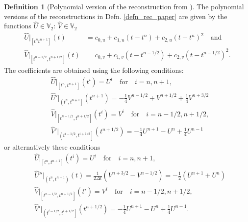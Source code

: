\documentclass[12pt,a4paper]{article}
\numberwithin{equation}{section}
\theoremstyle{definition}
\newcommand{\qp}[1]{\left(#1\right)}
\newcommand{\qpb}[1]{\left(#1\right]}
\newcommand{\qb}[1]{\left[#1\right]}
\newcommand{\rec}[1]{\widehat{{#1}}}
\newtheorem{Defn}[subsection]{Definition}
\begin{document}
\begin{Defn}[Polynomial version of the reconstruction from \cite{georgoulis2016posteriori}]\label{defn_rec_paper_poly}
	The polynomial versions of the reconstructions in Defn. \ref{defn_rec_paper} are given by the functions $\rec{U}\in \mathbb{V}_2$: $\rec{V}\in\mathbb{V}_2$ 
	\begin{equation}\label{eq_rec_paper_poly_alternative}
	\begin{aligned}
	\hat{U}|_{\qb{t^{n} t^{n+1}}}\qp{t}&=c_{0,u}+c_{1,u}\qp{t-t^{n}}+c_{2,u}\qp{t-t^{n}}^2\quad \text{and}\\
	\hat{V}|_{\qb{t^{n-1/2}, t^{n+1/2}}}\qp{t}&=c_{0,v}+c_{1,v}\qp{t-t^{n-1/2}}+c_{2,v}\qp{t-t^{n-1/2}}^2.
	\end{aligned}
	\end{equation}
	The coefficients are obtained using the following conditions:
	\begin{equation}
\begin{aligned}
&\rec{U}|_{\qb{t^n,t^{n+1}}}\qp{t^i}=U^i \quad \text{for}\quad i= n, n+1,\\
&\rec{U}'|_{\qpb{t^n,t^{n+1}}}\qp{t^{n+1}}=-\frac{1}{4}V^{n-1/2}+V^{n+1/2}+\frac{1}{4}V^{n+3/2}\\%
&\rec{V}|_{\qb{t^{n-1/2},t^{n+1/2}}}\qp{t^i}=V^i \quad \text{for}\quad i= n-1/2, n+1/2,\\
&\rec{V}'|_{\qpb{t^{i-1/2},t^{i+1/2}}}\qp{t^{n+1/2}}=-\frac{1}{4}U^{n+1}-U^n+\frac{1}{4}U^{n-1}
\end{aligned}
	\end{equation}
	or alternatively these conditions
	\begin{equation}\label{eq_alt_conds_paperrec}
	\begin{aligned}
	&\rec{U}|_{\qb{t^n,t^{n+1}}}\qp{t^i}=U^i \quad \text{for}\quad i= n, n+1,\\
	&\rec{U}''|_{\qp{t^n,t^{n+1}}}\qp{t}=\frac{1}{2\Delta t}\qp{V^{n+3/2}-V^{n-1/2}}=-\frac{1}{2}\qp{U^{n+1}+U^n}\\%
	&\rec{V}|_{\qb{t^{n-1/2},t^{n+1/2}}}\qp{t^i}=V^i \quad \text{for}\quad i= n-1/2, n+1/2,\\
	&\rec{V}'|_{\qpb{t^{i-1/2},t^{i+1/2}}}\qp{t^{n+1/2}}=-\frac{1}{4}U^{n+1}-U^n+\frac{1}{4}U^{n-1}.
	\end{aligned}
	\end{equation}
	

\end{Defn}
\end{document}
